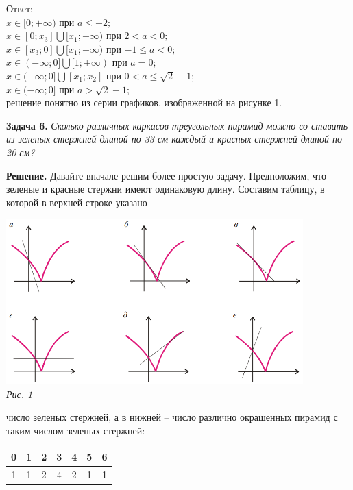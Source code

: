 {\begin{multicols}{3}
Ответ:\\
$x \in [0;+\infty)$ при $a \leq -2;$ \\
$x \in [0;x_3]\bigcup[x_1;+\infty)$ при $2 < a < 0;$ \\
$x \in [x_3;0]\bigcup[x_1;+\infty)$ при $-1\leq a<0;$ \\
$x \in (-\infty;0]\bigcup[1;+\infty)$ при $a=0;$ \\
$x \in (-\infty;0]\bigcup[x_1;x_2]$ при $0 < a \leq \sqrt{2} - 1;$ \\
$x \in (-\infty;0]$ при $a > \sqrt{2} - 1;$ \\
решение понятно из серии графиков, изображенной на рисунке 1. \par
\textbf{Задача 6.} \textsl{Сколько различных каркасов
треугольных пирамид можно со-ставить из зеленых стержней
длиной по 33 см каждый и красных стержней длиной по 20 см?} \par
\textbf{Решение.}  Давайте вначале решим более
простую задачу. Предположим, что зеленые и красные
стержни имеют одинаковую длину. Составим таблицу,
в которой в верхней строке указано
\begin{minipage}{\linewidth}
\includegraphics[height=6.4cm]{images/picture1.png} \\
\textsl{Рис. 1} \\
\end{minipage}
число зеленых стержней, а в нижней –
число различно окрашенных пирамид с
таким числом зеленых стержней:
\begin{center}
\begin{tabular}{|c|c|c|c|c|c|c|} 
\hline
0 & 1 & 2 & 3 & 4 & 5 & 6 \\ 
\hline
1 & 1 & 2 & 4 & 2 & 1 & 1 \\
\hline
\end{tabular}
\end{center}

\end{multicols}}
